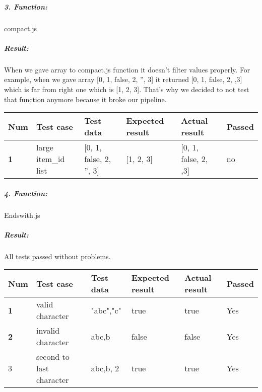\documentclass[a4paper, 12pt]{article}
\begin{document}
\newpage
		
		\hypertarget{header-n378}{%
		\subparagraph{3. Function:}\label{header-n378}}
		
		compact.js
		
		\hypertarget{header-n393}{%
		\subparagraph{\texorpdfstring{Result: }{Result: }}\label{header-n393}}
		
		When we gave array to compact.js function it doesn't filter values
		properly. For example, when we gave array {[}0, 1, false, 2, '', 3{]} it
		returned {[}0, 1, false, 2, ,3{]} which is far from right one which is
		{[}1, 2, 3{]}. That's why we decided to not test that function anymore
		because it broke our pipeline.
		
		\begin{table}[h!]
	        \begin{tabular}{|l|p{3cm}|p{2cm}|p{2cm}|p{2.5cm}|l|}
		\hline
		Num & Test case        					& Test data 					& Expected result 					& Actual result 		& Passed \\ \hline
		\textbf{1}   & large item\_id list 				& {[}0, 1, false, 2, '', 3{]}     		& {[}1, 2, 3{]}              		& {[}0, 1, false, 2, ,3{]}             	    	& no     \\ \hline
	        \end{tabular}
        \end{table}
		
		
		
		\hypertarget{header-n358}{%
		\subparagraph{4. Function:}\label{header-n358}}
		
		Endswith.js
		
		\hypertarget{header-n114}{%
		\subparagraph{\texorpdfstring{Result: }{Result: }}\label{header-n114}}
		
		All tests passed without problems.
		
		\begin{table}[h!]
	        \begin{tabular}{|l|p{3cm}|p{2cm}|p{2cm}|p{2.5cm}|l|}
		\hline
		Num & Test case        					& Test data 					& Expected result 					& Actual result 		        & Passed \\ \hline
		\textbf{1}   & valid character 					    	& "abc","c"      	& true                				& true             		    & Yes     \\ \hline
		\textbf{2}   & invalid character				    	& abc,b     		& false               				& false             		& Yes     \\ \hline
		3   & second to last character					& abc,b, 2     		& true               				& true             	    	& Yes     \\ \hline
	        \end{tabular}
        \end{table}
		
\end{document}
